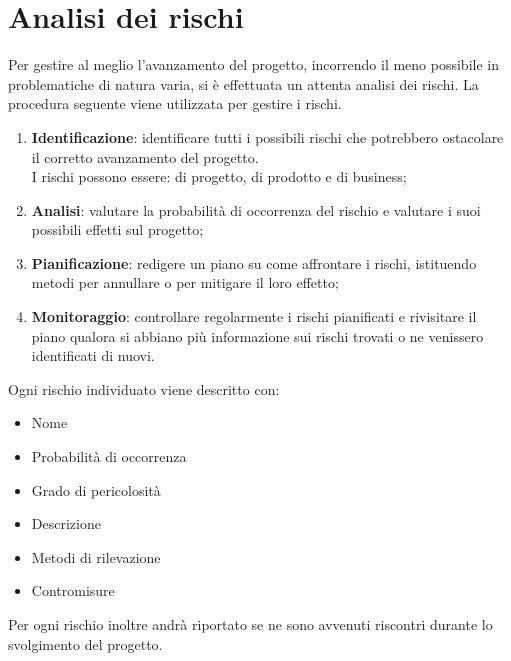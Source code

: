 %
%


\section{Analisi dei rischi} %
\label{sec:analisi_dei_rischi}
Per gestire al meglio l'avanzamento del progetto, incorrendo il meno possibile in problematiche di natura varia, si è effettuata un attenta analisi dei rischi. La procedura seguente viene utilizzata per gestire i rischi.
	\begin{enumerate}
		\item \textbf{Identificazione}: identificare tutti i possibili rischi che potrebbero ostacolare il corretto avanzamento del progetto. \\
		I rischi possono essere: di progetto, di prodotto e di business;
		\item \textbf{Analisi}: valutare la probabilità di occorrenza del rischio e valutare i suoi possibili effetti sul progetto;
		\item \textbf{Pianificazione}: redigere un piano su come affrontare i rischi, istituendo metodi per annullare o per mitigare il loro effetto;
		\item \textbf{Monitoraggio}: controllare regolarmente i rischi pianificati e rivisitare il piano qualora si abbiano più informazione sui rischi trovati o ne venissero identificati di nuovi.
	\end{enumerate}
\noindent
Ogni rischio individuato viene descritto con: 
	\begin{itemize}
		\item Nome
		\item Probabilità di occorrenza
		\item Grado di pericolosità
		\item Descrizione
		\item Metodi di rilevazione
		\item Contromisure
	\end{itemize}
\noindent
Per ogni rischio inoltre andrà riportato se ne sono avvenuti riscontri durante lo svolgimento del progetto.


